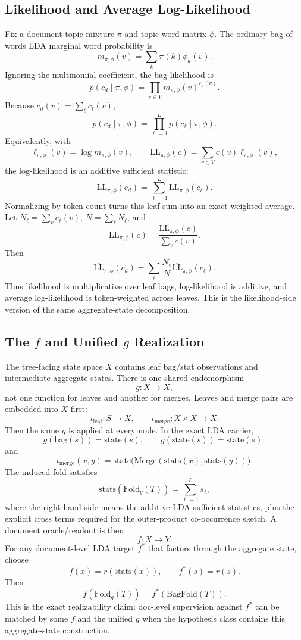 \subsection{Likelihood and Average Log-Likelihood}

Fix a document topic mixture $\pi$ and topic-word matrix $\phi$. The ordinary
bag-of-words LDA marginal word probability is
\[
  m_{\pi,\phi}(v) = \sum_k \pi(k)\phi_k(v).
\]
Ignoring the multinomial coefficient, the bag likelihood is
\[
  p(c_d\mid \pi,\phi)
  = \prod_{v\in V} m_{\pi,\phi}(v)^{c_d(v)}.
\]
Because $c_d(v)=\sum_\ell c_\ell(v)$,
\[
  p(c_d\mid \pi,\phi)
  = \prod_{\ell=1}^L p(c_\ell\mid \pi,\phi).
\]
Equivalently, with
\[
  \ell_{\pi,\phi}(v) = \log m_{\pi,\phi}(v),
  \qquad
  \mathrm{LL}_{\pi,\phi}(c)
    = \sum_{v\in V} c(v)\ell_{\pi,\phi}(v),
\]
the log-likelihood is an additive sufficient statistic:
\[
  \mathrm{LL}_{\pi,\phi}(c_d)
  = \sum_{\ell=1}^L \mathrm{LL}_{\pi,\phi}(c_\ell).
\]
Normalizing by token count turns this leaf sum into an exact weighted average.
Let $N_\ell=\sum_v c_\ell(v)$, $N=\sum_\ell N_\ell$, and
\[
  \overline{\mathrm{LL}}_{\pi,\phi}(c)
  = \frac{\mathrm{LL}_{\pi,\phi}(c)}{\sum_v c(v)}.
\]
Then
\[
  \overline{\mathrm{LL}}_{\pi,\phi}(c_d)
  = \sum_\ell \frac{N_\ell}{N}
    \overline{\mathrm{LL}}_{\pi,\phi}(c_\ell).
\]
Thus likelihood is multiplicative over leaf bags, log-likelihood is additive,
and average log-likelihood is token-weighted across leaves. This is the
likelihood-side version of the same aggregate-state decomposition.

\subsection{The \texorpdfstring{$f$}{f} and Unified \texorpdfstring{$g$}{g} Realization}

The tree-facing state space $X$ contains leaf bag/stat observations and
intermediate aggregate states. There is one shared endomorphism
\[
  g : X \to X,
\]
not one function for leaves and another for merges. Leaves and merge pairs are
embedded into $X$ first:
\[
  \iota_{\mathrm{leaf}} : S \to X,
  \qquad
  \iota_{\mathrm{merge}} : X\times X \to X.
\]
Then the same $g$ is applied at every node. In the exact LDA carrier,
\[
  g(\mathrm{bag}(s)) = \mathrm{state}(s),
  \qquad
  g(\mathrm{state}(s)) = \mathrm{state}(s),
\]
and
\[
  \iota_{\mathrm{merge}}(x,y)
  = \mathrm{state}\big(\mathrm{Merge}(\mathrm{stats}(x),\mathrm{stats}(y))\big).
\]
The induced fold satisfies
\[
  \mathrm{stats}(\mathrm{Fold}_g(T))
  = \sum_{\ell=1}^L s_\ell,
\]
where the right-hand side means the additive LDA sufficient statistics, plus
the explicit cross terms required for the outer-product co-occurrence sketch.
A document oracle/readout is then
\[
  f : X \to Y.
\]
For any document-level LDA target $f^\ast$ that factors through the aggregate
state, choose
\[
  f(x) = r(\mathrm{stats}(x)),
  \qquad
  f^\ast(s)=r(s).
\]
Then
\[
  f(\mathrm{Fold}_g(T)) = f^\ast(\mathrm{BagFold}(T)).
\]
This is the exact realizability claim: doc-level supervision against $f^\ast$
can be matched by some $f$ and the unified $g$ when the hypothesis class
contains this aggregate-state construction.


